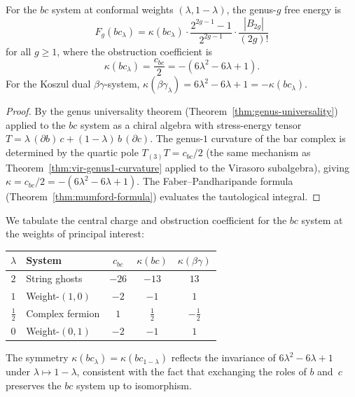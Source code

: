 \begin{theorem}\label{thm:fermion-all-genera}
For the $bc$ system at conformal weights $(\lambda, 1-\lambda)$,
the genus-$g$ free energy is
\begin{equation}\label{eq:fermion-Fg}
F_g(bc_\lambda) = \kappa(bc_\lambda) \cdot
\frac{2^{2g-1}-1}{2^{2g-1}} \cdot
\frac{|B_{2g}|}{(2g)!}
\end{equation}
for all $g \geq 1$, where the obstruction coefficient is
\begin{equation}\label{eq:fermion-kappa}
\kappa(bc_\lambda) = \frac{c_{bc}}{2}
= -(6\lambda^2 - 6\lambda + 1).
\end{equation}
For the Koszul dual $\beta\gamma$-system,
$\kappa(\beta\gamma_\lambda) = 6\lambda^2 - 6\lambda + 1
= -\kappa(bc_\lambda)$.
\end{theorem}

\begin{proof}
By the genus universality theorem
(Theorem~\ref{thm:genus-universality}) applied to
the $bc$ system as a chiral algebra with stress-energy tensor
$T = \lambda\,(\partial b)\,c + (1-\lambda)\,b\,(\partial c)$.
The genus-$1$ curvature of the bar complex is determined by
the quartic pole $T_{(3)}T = c_{bc}/2$
(the same mechanism as Theorem~\ref{thm:vir-genus1-curvature}
applied to the Virasoro subalgebra), giving
$\kappa = c_{bc}/2 = -(6\lambda^2 - 6\lambda + 1)$.
The Faber--Pandharipande formula
(Theorem~\ref{thm:mumford-formula}) evaluates the
tautological integral.
\end{proof}

\begin{computation}\label{comp:fermion-kappa-table}
We tabulate the central charge and obstruction coefficient
for the $bc$ system at the weights of principal interest:

\medskip
\begin{center}
\renewcommand{\arraystretch}{1.3}
\begin{tabular}{clccc}
\toprule
$\lambda$ & System & $c_{bc}$ & $\kappa(bc)$ & $\kappa(\beta\gamma)$ \\
\midrule
$2$ & String ghosts & $-26$ & $-13$ & $13$ \\[3pt]
$1$ & Weight-$(1,0)$ & $-2$ & $-1$ & $1$ \\[3pt]
$\frac{1}{2}$ & Complex fermion & $1$ & $\frac{1}{2}$ & $-\frac{1}{2}$ \\[6pt]
$0$ & Weight-$(0,1)$ & $-2$ & $-1$ & $1$ \\[3pt]
\bottomrule
\end{tabular}
\end{center}

\medskip
\noindent
The symmetry $\kappa(bc_\lambda) = \kappa(bc_{1-\lambda})$
reflects the invariance of $6\lambda^2 - 6\lambda + 1$ under
$\lambda \mapsto 1 - \lambda$, consistent with the fact that
exchanging the roles of $b$ and~$c$ preserves the $bc$ system
up to isomorphism.
\end{computation}

